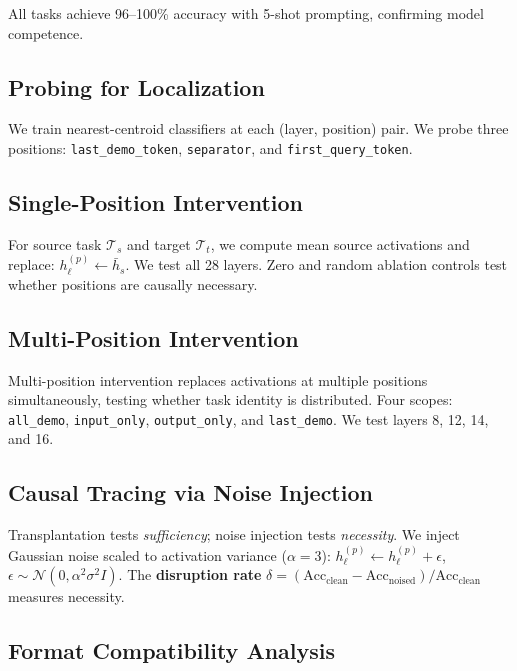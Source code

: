\documentclass{article}
\begin{document}
All tasks achieve 96--100\% accuracy with 5-shot prompting, confirming model competence.

\subsection{Probing for Localization}

We train nearest-centroid classifiers at each (layer, position) pair. We probe three positions: \texttt{last\_demo\_token}, \texttt{separator}, and \texttt{first\_query\_token}.

\subsection{Single-Position Intervention}

For source task $\mathcal{T}_s$ and target $\mathcal{T}_t$, we compute mean source activations and replace: $h_\ell^{(p)} \leftarrow \bar{h}_s$. We test all 28 layers. Zero and random ablation controls test whether positions are causally necessary.

\subsection{Multi-Position Intervention}

Multi-position intervention replaces activations at multiple positions simultaneously, testing whether task identity is distributed. Four scopes: \texttt{all\_demo}, \texttt{input\_only}, \texttt{output\_only}, and \texttt{last\_demo}. We test layers 8, 12, 14, and 16.

\subsection{Causal Tracing via Noise Injection}

Transplantation tests \emph{sufficiency}; noise injection tests \emph{necessity}. We inject Gaussian noise scaled to activation variance ($\alpha = 3$): $h_\ell^{(p)} \leftarrow h_\ell^{(p)} + \epsilon$, $\epsilon \sim \mathcal{N}(0, \alpha^2 \sigma^2 I)$. The \textbf{disruption rate} $\delta = (\text{Acc}_{\text{clean}} - \text{Acc}_{\text{noised}}) / \text{Acc}_{\text{clean}}$ measures necessity.

\subsection{Format Compatibility Analysis}
\end{document}
